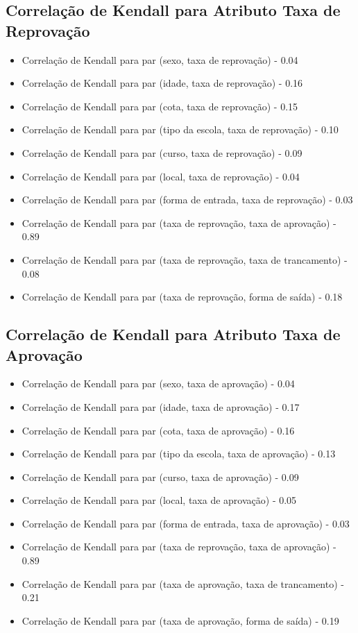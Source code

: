 \subsection{Correlação de Kendall para Atributo Taxa de Reprovação}
\begin{itemize}
    \item Correlação de Kendall para par (sexo, taxa de reprovação) - 0.04
    \item Correlação de Kendall para par (idade, taxa de reprovação) - 0.16
    \item Correlação de Kendall para par (cota, taxa de reprovação) - 0.15
    \item Correlação de Kendall para par (tipo da escola, taxa de reprovação) - 0.10
    \item Correlação de Kendall para par (curso, taxa de reprovação) - 0.09
    \item Correlação de Kendall para par (local, taxa de reprovação) - 0.04
    \item Correlação de Kendall para par (forma de entrada, taxa de reprovação) - 0.03
    \item Correlação de Kendall para par (taxa de reprovação, taxa de aprovação) - 0.89
    \item Correlação de Kendall para par (taxa de reprovação, taxa de trancamento) - 0.08
    \item Correlação de Kendall para par (taxa de reprovação, forma de saída) - 0.18
\end{itemize}

\subsection{Correlação de Kendall para Atributo Taxa de Aprovação}
\begin{itemize}
    \item Correlação de Kendall para par (sexo, taxa de aprovação) - 0.04
    \item Correlação de Kendall para par (idade, taxa de aprovação) - 0.17
    \item Correlação de Kendall para par (cota, taxa de aprovação) - 0.16
    \item Correlação de Kendall para par (tipo da escola, taxa de aprovação) - 0.13
    \item Correlação de Kendall para par (curso, taxa de aprovação) - 0.09
    \item Correlação de Kendall para par (local, taxa de aprovação) - 0.05
    \item Correlação de Kendall para par (forma de entrada, taxa de aprovação) - 0.03
    \item Correlação de Kendall para par (taxa de reprovação, taxa de aprovação) - 0.89
    \item Correlação de Kendall para par (taxa de aprovação, taxa de trancamento) - 0.21
    \item Correlação de Kendall para par (taxa de aprovação, forma de saída) - 0.19
\end{itemize}

